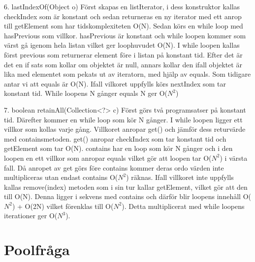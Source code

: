 \documentclass[a4paper,10pt,oneside,onecolumn]{article}
\begin{document}
6. lastIndexOf(Object o)
Först skapas en listIterator, i dess konstruktor kallas checkIndex som är konstant och sedan returneras en ny iterator med ett anrop till getElement som har tidskomplexiteten O(N).
Sedan körs en while loop med hasPrevious som villkor. hasPrevious är konstant och while loopen kommer som värst gå igenom hela listan vilket ger loophuvudet O(N).
I while loopen kallas först previous som returnerar element före i listan på konstant tid.
Efter det är det en if sats som kollar om objektet är null, annars kollar den ifall objektet är lika med elementet som pekats ut av iteratorn, med hjälp av equals. Som tidigare antar vi att equals är O(N).
Ifall vilkoret uppfylls körs nextIndex som tar konstant tid.
While loopens N gånger equals N ger O($N^{2}$)

7.  boolean retainAll(Collection<?> c)
Först görs två programsatser på konstant tid.
Därefter kommer en while loop som kör N gånger.
I while loopen ligger ett villkor som kollas varje gång. Villkoret anropar get() och jämför dess returvärde med containsmetoden.
get() anropar checkIndex som tar konstant tid och getElement som tar O(N).
contains har en loop som kör N gånger och i den loopen en ett villkor som anropar equals vilket gör att loopen tar O($N^{2}$) i värsta fall.
Då anropet av get görs före contains kommer deras ordo värden inte multipliceras utan endast contains O($N^{2}$) räknas.
Ifall villkoret inte uppfylls kallas remove(index) metoden som i sin tur kallar getElement, vilket gör att den till O(N).
Denna ligger i sekvens med contains och därför blir loopens innehåll O($N^{2}$) + O(2N) vilket förenklas till O($N^{2}$).
Detta multiplicerat med while loopens iterationer ger O($N^{3}$).
\section{Poolfråga}

%


%
%
\end{document}
